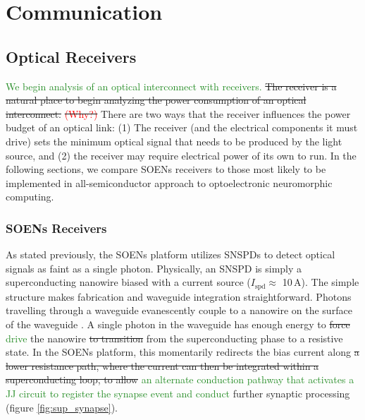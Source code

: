 \documentclass[twocolumn]{article}
\begin{document}
\section{\label{sec:communication}Communication}
\subsection{Optical Receivers}
\textcolor{ForestGreen}{We begin analysis of an optical interconnect with receivers.} \sout{The receiver is a natural place to begin analyzing the power consumption of an optical interconnect.} \sout{\textcolor{red}{(Why?)}} There are two ways that the receiver influences the power budget of an optical link: (1) The receiver (and the electrical components it must drive) sets the minimum optical signal that needs to be produced by the light source, and (2) the receiver may require electrical power of its own to run. In the following sections, we compare SOENs receivers \cite{shainline2019superconducting} to those most likely to be implemented in all-semiconductor approach to optoelectronic neuromorphic computing.

\subsubsection{SOENs Receivers}
As stated previously, the SOENs platform utilizes SNSPDs to detect optical signals as faint as a single photon. Physically, an SNSPD is simply a superconducting nanowire biased with a current source ($I_{\mathrm{spd}} \approx$ 10\,\textmu A). The simple structure makes fabrication and waveguide integration straightforward. Photons travelling through a waveguide evanescently couple to a nanowire on the surface of the waveguide \cite{}. A single photon in the waveguide has enough energy to \sout{force} \textcolor{ForestGreen}{drive} the nanowire \sout{to transition} from the superconducting phase to a resistive state. In the SOENs platform, this momentarily redirects the bias current along \sout{a lower resistance path, where the current can then be integrated within a superconducting loop, to allow} \textcolor{ForestGreen}{an alternate conduction pathway that activates a JJ circuit to register the synapse event and conduct} further synaptic processing (figure \ref{fig:sup_synapse}).
\end{document}
